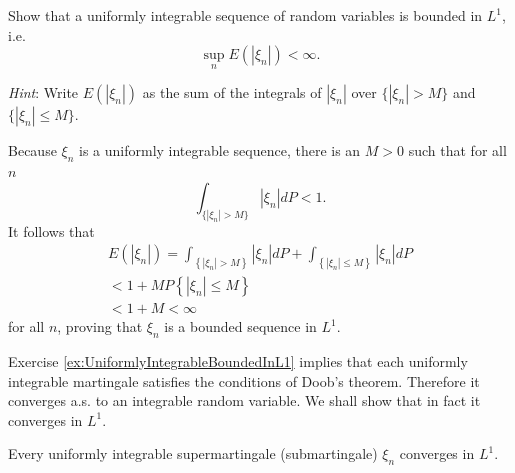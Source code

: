 \begin{Exercise}
\label{ex:UniformlyIntegrableBoundedInL1}
Show that a uniformly integrable sequence of random variables is bounded in $L^1$, i.e.
\[
\sup_{n} E \left(\left| \xi_{n} \right|\right) < \infty .
\]

\textit{Hint}: Write $E(|\xi_n|)$ as the sum of the integrals of $|\xi_n|$ over $\{|\xi_n| > M\}$ and $\{|\xi_n| \leq M\}$.
\end{Exercise}

\begin{Solution}
\label{sol:Exercise46}
Because $\xi_{n}$ is a uniformly integrable sequence, there is an $M > 0$ such that for all $n$
\[
\int_{\{|\xi_{n}| > M\}} | \xi_{n} | d P < 1.
\]
It follows that
\[
\begin{array}{l}
E \left(\left| \xi_{n} \right|\right) = \int_{\left\{\left| \xi_{n} \right| > M \right\}} \left| \xi_{n} \right| d P + \int_{\left\{\left| \xi_{n} \right| \leq M \right\}} \left| \xi_{n} \right| d P \\
< 1 + M P \left\{\left| \xi_{n} \right| \leq M \right\} \\
< 1 + M < \infty
\end{array}
\]
for all $n$, proving that $\xi_{n}$ is a bounded sequence in $L^{1}$.
\end{Solution}

Exercise \ref{ex:UniformlyIntegrableBoundedInL1} implies that each uniformly integrable martingale satisfies the conditions of Doob's theorem. Therefore it converges a.s. to an integrable random variable. We shall show that in fact it converges in $L^1$.

\begin{Theorem}
\label{th:UniformIntegrabilitySufficient}
Every uniformly integrable supermartingale (submartingale) $\xi_{n}$ converges in $L^1$.
\end{Theorem}


